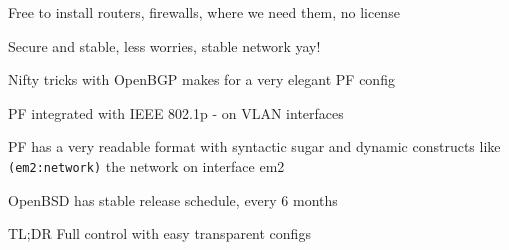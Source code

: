 \documentclass[Screen16to9,17pt]{foils}
\begin{document}
\begin{list2}
\item Free to install routers, firewalls, where we need them, no license
\item Secure and stable, less worries, stable network yay!
\item Nifty tricks with OpenBGP makes for a very elegant PF config
\item PF integrated with IEEE 802.1p - on VLAN interfaces
\item PF has a very readable format with syntactic sugar and dynamic constructs like \verb+(em2:network)+ the network on interface em2
\item OpenBSD has stable release schedule, every 6 months
\end{list2}

TL;DR Full control with easy transparent configs
\end{document}
